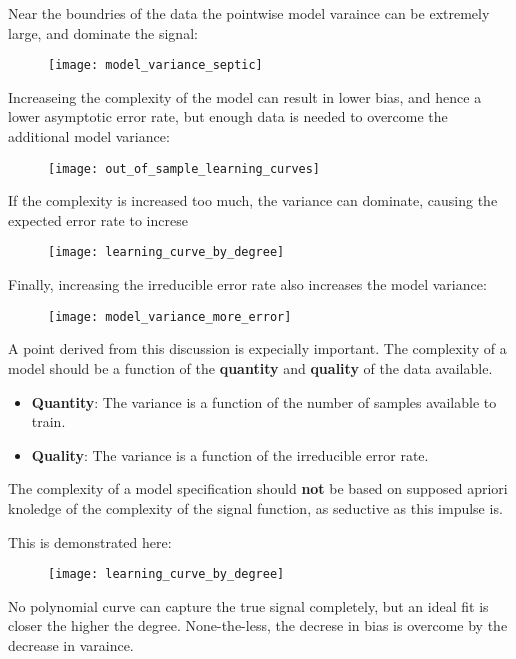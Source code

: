 %
%
\begin{frame}
  Near the boundries of the data the pointwise model varaince can be extremely
  large, and dominate the signal:
  \begin{figure}
    \texttt{[image: model\_variance\_septic]}
  \end{figure}
\end{frame}
%
%
\begin{frame}
  Increaseing the complexity of the model can result in lower bias, and hence a
  lower asymptotic error rate, but enough data is needed to overcome the
  additional model variance:
  \begin{figure}
    \texttt{[image: out\_of\_sample\_learning\_curves]}
  \end{figure}
\end{frame}
%
%
\begin{frame}
  If the complexity is increased too much, the variance can dominate, causing
  the expected error rate to increse
  \begin{figure}
    \texttt{[image: learning\_curve\_by\_degree]}
  \end{figure}
\end{frame}
%
%
\begin{frame}
  Finally, increasing the irreducible error rate also increases the model variance:
  \begin{figure}
    \texttt{[image: model\_variance\_more\_error]}
  \end{figure}
\end{frame}
%
%
\begin{frame}
  A point derived from this discussion is expecially important.  The complexity
  of a model should be a function of the \textbf{quantity} and \textbf{quality}
  of the data available.
  \begin{itemize}
    \item \textbf{Quantity}: The variance is a function of the number of samples
    available to train.
    \item \textbf{Quality}: The variance is a function of the irreducible error rate.
  \end{itemize}
\end{frame}
%
\begin{frame}
  The complexity of a model specification should \textbf{not} be based on
  supposed apriori knoledge of the complexity of the signal function, as
  seductive as this impulse is.
\end{frame}
%
%
\begin{frame}
  This is demonstrated here:
  \begin{figure}
    \texttt{[image: learning\_curve\_by\_degree]}
  \end{figure}
  No polynomial curve can capture the true signal completely, but an ideal fit
  is closer the higher the degree.  None-the-less, the decrese in bias is
  overcome by the decrease in varaince.
\end{frame}

